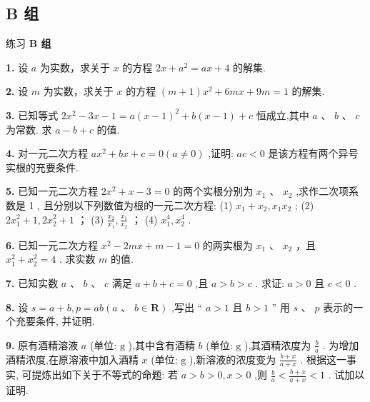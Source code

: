 \documentclass[a4paper,10pt,oneside,fontset=none]{ctexbook}
\newenvironment{exercise}[1][]{\begin{exBox}{练习}{#1}}{\end{exBox}}
\numberwithin{equation}{chapter}
\begin{document}
\subsection*{B 组}

\begin{exercise}
\textbf{B 组}\par\vspace{0.5em}
\textbf{1.} 设 $a$ 为实数，求关于 $x$ 的方程 ${2x} + {a}^{2} = {ax} + 4$ 的解集.
\par\vspace{0.8em}
\textbf{2.} 设 $m$ 为实数，求关于 $x$ 的方程 $\left( {m + 1}\right) {x}^{2} + {6mx} + {9m} = 1$ 的解集.
\par\vspace{0.8em}
\textbf{3.} 已知等式 $2{x}^{2} - {3x} - 1 = a{\left( x - 1\right) }^{2} + b\left( {x - 1}\right)  + c$ 恒成立,其中 $a\text{ 、 }b\text{ 、 }c$ 为常数. 求 $a - b + c$ 的值.
\par\vspace{0.8em}
\textbf{4.} 对一元二次方程 $a{x}^{2} + {bx} + c = 0\left( {a \neq  0}\right)$ ,证明: ${ac} < 0$ 是该方程有两个异号实根的充要条件.
\par\vspace{0.8em}
\textbf{5.} 已知一元二次方程 $2{x}^{2} + x - 3 = 0$ 的两个实根分别为 ${x}_{1}\text{ 、 }{x}_{2}$ ,求作二次项系数是 1 , 且分别以下列数值为根的一元二次方程: (1) ${x}_{1} + {x}_{2},{x}_{1}{x}_{2}$ ; (2) $2{x}_{1}^{2} + 1,2{x}_{2}^{2} + 1$ ； (3) $\frac{{x}_{2}}{{x}_{1}},\frac{{x}_{1}}{{x}_{2}}$ ； (4) ${x}_{1}^{4},{x}_{2}^{4}$ .
\par\vspace{0.8em}
\textbf{6.} 已知一元二次方程 ${x}^{2} - {2mx} + m - 1 = 0$ 的两实根为 ${x}_{1}\text{ 、 }{x}_{2}$ ，且 ${x}_{1}^{2} + {x}_{2}^{2} = 4$ . 求实数 $m$ 的值.
\par\vspace{0.8em}
\textbf{7.} 已知实数 $a\text{ 、 }b\text{ 、 }c$ 满足 $a + b + c = 0$ ,且 $a > b > c$ . 求证: $a > 0$ 且 $c < 0$ .
\par\vspace{0.8em}
\textbf{8.} 设 $s = a + b, p = {ab}\left( {a\text{ 、 }b \in  \mathbf{R}}\right)$ ,写出 “ $a > 1$ 且 $b > 1$ ” 用 $s\text{ 、 }p$ 表示的一个充要条件, 并证明.
\par\vspace{0.8em}
\textbf{9.} 原有酒精溶液 $a$ (单位: $\mathrm{g}$ ),其中含有酒精 $b$ (单位: $\mathrm{g}$ ),其酒精浓度为 $\frac{b}{a}$ . 为增加酒精浓度,在原溶液中加入酒精 $x$ (单位: $\mathrm{g}$ ),新溶液的浓度变为 $\frac{b + x}{a + x}$ . 根据这一事实, 可提炼出如下关于不等式的命题: 若 $a > b > 0, x > 0$ ,则 $\frac{b}{a} < \frac{b + x}{a + x} < 1$ . 试加以证明.
\end{exercise}
\end{document}
